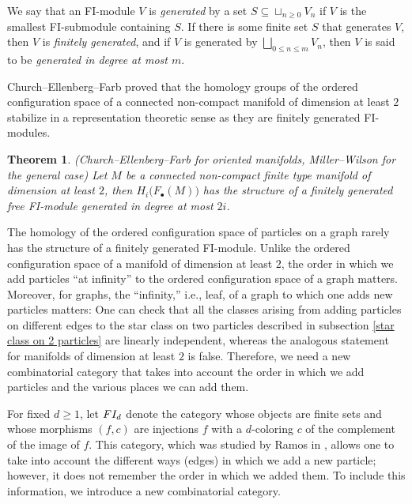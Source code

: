 \documentclass[pagebackref,colorlinks,citecolor=blue,linkcolor=blue,urlcolor=blue,filecolor=blue]{article}
\newtheorem{thm}{Theorem}[section]
\theoremstyle{definition}\newtheorem{definition}[thm]{Definition}
\theoremstyle{definition}
\begin{document}
We say that an FI-module $V$ is \emph{generated} by a set $S\subseteq \sqcup_{n\ge 0}V_{n}$ if $V$ is the smallest FI-submodule containing $S$. 
If there is some finite set $S$ that generates $V$, then $V$ is \emph{finitely generated}, and if $V$ is generated by $\bigsqcup_{0\le n\le m}V_{n}$, then $V$ is said to be \emph{generated in degree at most $m$}.

Church--Ellenberg--Farb proved that the homology groups of the ordered configuration space of a connected non-compact manifold of dimension at least $2$ stabilize in a representation theoretic sense as they are finitely generated FI-modules.

\begin{thm}\label{manifold rep stab}
(Church--Ellenberg--Farb \cite[Theorem 6.4.3]{church2015fi} for oriented manifolds, Miller--Wilson \cite[1.1]{miller2019higher} for the general case)
Let $M$ be a connected non-compact finite type manifold of dimension at least $2$, then $H_{i}\big(F_{\bullet}(M)\big)$ has the structure of a finitely generated free FI-module generated in degree at most $2i$.
\end{thm}

The homology of the ordered configuration space of particles on a graph rarely has the structure of a finitely generated FI-module.
Unlike the ordered configuration space of a manifold of dimension at least $2$, the order in which we add particles ``at infinity'' to the ordered configuration space of a graph matters.
Moreover, for graphs, the ``infinity,'' i.e., leaf, of a graph to which one adds new particles matters: One can check that all the classes arising from adding particles on different edges to the star class on two particles described in subsection \ref{star class on 2 particles} are linearly independent, whereas the analogous statement for manifolds of dimension at least $2$ is false.
Therefore, we need a new combinatorial category that takes into account the order in which we add particles and the various places we can add them.

For fixed $d\ge 1$, let $\emph{FI}_{d}$ denote the category whose objects are finite sets and whose morphisms $(f, c)$ are injections $f$ with a $d$-coloring $c$ of the complement of the image of $f$.
This category, which was studied by Ramos in \cite{ramos2017generalized}, allows one to take into account the different ways (edges) in which we add a new particle; however, it does not remember the order in which we added them.
To include this information, we introduce a new combinatorial category.
\end{document}
